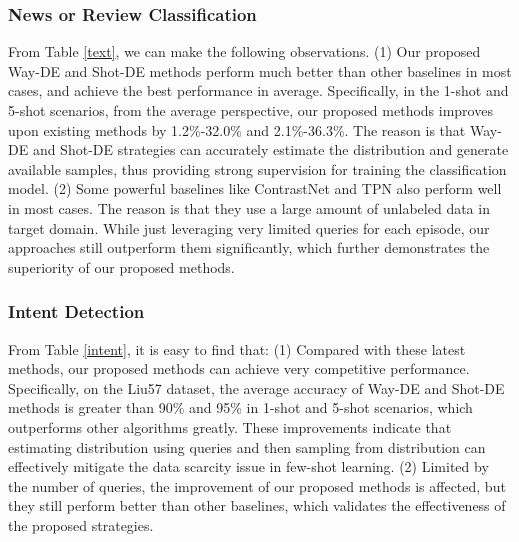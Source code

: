 \documentclass[letterpaper]{article} %
\begin{document}
\subsubsection{News or Review Classification}
From Table \ref{text}, we can make the following observations. (1) Our proposed Way-DE and Shot-DE methods perform much better than other baselines in most cases, and achieve the best performance in average. Specifically, in the 1-shot and 5-shot scenarios, from the average perspective, our proposed methods improves upon existing methods by 1.2\%-32.0\% and 2.1\%-36.3\%. The reason is that Way-DE and Shot-DE strategies can accurately estimate the distribution and generate available samples, thus providing strong supervision for training the classification model.  (2) Some powerful baselines like ContrastNet and TPN also perform well in most cases. The reason is that they use a large amount of unlabeled data in target domain. While just leveraging very limited queries for each episode, our approaches still outperform them significantly, which further demonstrates the superiority of our proposed methods.

\subsubsection{Intent Detection}
From Table \ref{intent}, it is easy to find that: (1) Compared with these latest methods, our proposed methods can achieve very competitive performance. Specifically, on the Liu57 dataset, the average accuracy of Way-DE and Shot-DE methods is greater than 90\% and 95\% in 1-shot and 5-shot scenarios, which outperforms other algorithms greatly. These improvements indicate that estimating distribution using queries and then sampling from distribution can effectively mitigate the data scarcity issue in few-shot learning. (2) Limited by the number of queries, the improvement of our proposed methods is affected, but they still perform better than other baselines, which validates the effectiveness of the proposed strategies.
\end{document}
